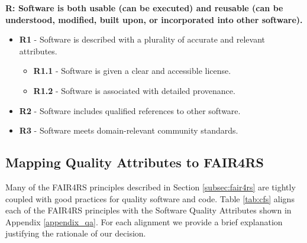 \textbf{R: Software is both usable (can be executed) and reusable (can be understood, modified, built
upon, or incorporated into other software).}

\begin{itemize}
    \item \textbf{R1} - Software is described with a plurality of accurate and relevant attributes.

    \begin{itemize}
        \item \textbf{R1.1} - Software is given a clear and accessible license.
        \item \textbf{R1.2} - Software is associated with detailed provenance.
    \end{itemize}

    \item \textbf{R2} - Software includes qualified references to other software.
    \item \textbf{R3} - Software meets domain-relevant community standards.
\end{itemize}

\subsection{Mapping Quality Attributes to FAIR4RS}\label{subsec:fair4rs_fair}

Many of the FAIR4RS principles described in Section \ref{subsec:fair4rs}  are tightly coupled with good practices for quality software and code. Table \ref{tab:cfs} aligns each of the FAIR4RS principles with the Software Quality Attributes shown in Appendix \ref{appendix_qa}. For each alignment we provide a brief explanation justifying the rationale of our decision. 

